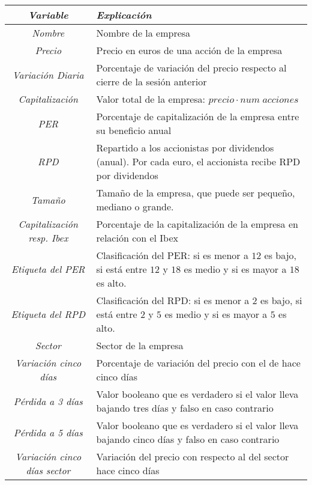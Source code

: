 \documentclass[11pt,openany]{book} %
\begin{document}
\begin{enumerate}[\color{ocre}{$\bullet$}]
    \begin{table}[!h]
    \centering
    {
    \begin{tabular}{|c|p{8cm}|}
    \hline
    \textcolor{ocre}{\textit{\textbf{Variable}}} & \textcolor{ocre}{\textit{\textbf{Explicación}}} \\
    \hline
    \textit{Nombre} & Nombre de la empresa \\
    \hline
    \textit{Precio} & Precio en euros de una acción de la empresa \\
    \hline
    \textit{Variación Diaria} & Porcentaje de variación del precio respecto al cierre de la sesión anterior \\
    \hline
    \textit{Capitalización} & Valor total de la empresa: $precio \cdot num\;acciones$\\
    \hline
    \textit{PER} & Porcentaje de capitalización de la empresa entre su beneficio anual \\
    \hline
    \textit{RPD} & Repartido a los accionistas por dividendos (anual). Por cada euro, el accionista recibe RPD por dividendos \\
    \hline
    \textit{Tamaño} & Tamaño de la empresa, que puede ser pequeño, mediano o grande. \\
    \hline
    \textit{Capitalización resp. Ibex} & Porcentaje de la capitalización de la empresa en relación con el Ibex \\
    \hline
    \textit{Etiqueta del PER} & Clasificación del PER: si es menor a $12$ es bajo, si está entre $12$ y $18$ es medio y si es mayor a $18$ es alto. \\
    \hline
    \textit{Etiqueta del RPD} & Clasificación del RPD: si es menor a $2$ es bajo, si está entre $2$ y $5$ es medio y si es mayor a $5$ es alto. \\
    \hline
    \textit{Sector} & Sector de la empresa \\
    \hline
    \textit{Variación cinco días} & Porcentaje de variación del precio con el de hace cinco días \\
    \hline
    \textit{Pérdida a 3 días} & Valor booleano que es verdadero si el valor lleva bajando tres días y falso en caso contrario \\
    \hline
    \textit{Pérdida a 5 días} & Valor booleano que es verdadero si el valor lleva bajando cinco días y falso en caso contrario \\
    \hline
    \textit{Variación cinco días sector} & Variación del precio con respecto al del sector hace cinco días \\

\end{tabular}}
\end{table}
\end{enumerate}
\end{document}
